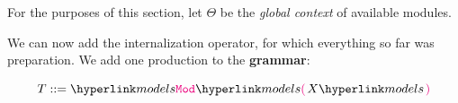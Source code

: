  For the purposes of this section, let $\Theta$ be the \emph{global context} of available modules.

%	
%	


\hypertarget{models}{We can now add the internalization operator, for which everything so far was preparation.
We add one production to the \textbf{grammar}:}
\[T ::= \modelsof X\]

